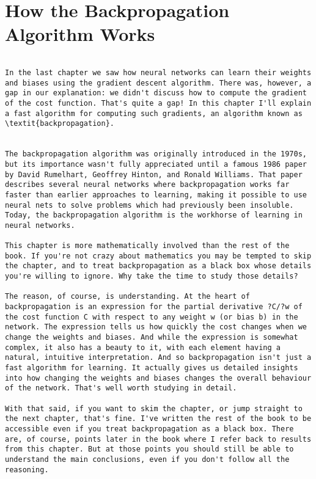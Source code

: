 
\chapter{How the Backpropagation Algorithm Works}

\begin{lstlisting}

In the last chapter we saw how neural networks can learn their weights and biases using the gradient descent algorithm. There was, however, a gap in our explanation: we didn't discuss how to compute the gradient of the cost function. That's quite a gap! In this chapter I'll explain a fast algorithm for computing such gradients, an algorithm known as \textit{backpropagation}. 


The backpropagation algorithm was originally introduced in the 1970s, but its importance wasn't fully appreciated until a famous 1986 paper by David Rumelhart, Geoffrey Hinton, and Ronald Williams. That paper describes several neural networks where backpropagation works far faster than earlier approaches to learning, making it possible to use neural nets to solve problems which had previously been insoluble. Today, the backpropagation algorithm is the workhorse of learning in neural networks.

This chapter is more mathematically involved than the rest of the book. If you're not crazy about mathematics you may be tempted to skip the chapter, and to treat backpropagation as a black box whose details you're willing to ignore. Why take the time to study those details?

The reason, of course, is understanding. At the heart of backpropagation is an expression for the partial derivative ?C/?w of the cost function C with respect to any weight w (or bias b) in the network. The expression tells us how quickly the cost changes when we change the weights and biases. And while the expression is somewhat complex, it also has a beauty to it, with each element having a natural, intuitive interpretation. And so backpropagation isn't just a fast algorithm for learning. It actually gives us detailed insights into how changing the weights and biases changes the overall behaviour of the network. That's well worth studying in detail.

With that said, if you want to skim the chapter, or jump straight to the next chapter, that's fine. I've written the rest of the book to be accessible even if you treat backpropagation as a black box. There are, of course, points later in the book where I refer back to results from this chapter. But at those points you should still be able to understand the main conclusions, even if you don't follow all the reasoning.


\end{lstlisting}
